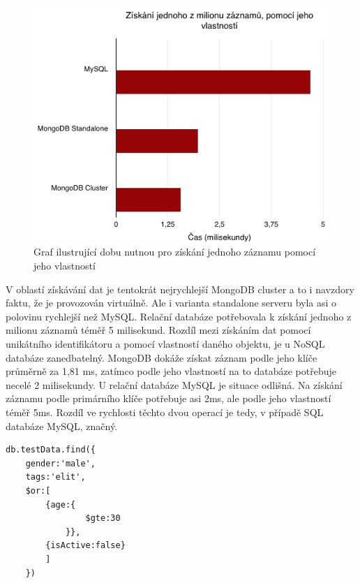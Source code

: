 \begin{figure}[h]
\begin{centering}
\includegraphics[scale=0.6]{obrazky/grafy/select}
\par\end{centering}
\caption{Graf ilustrující dobu nutnou pro získání jednoho záznamu pomocí jeho vlastností}
\end{figure}

\pagebreak
V oblastí získávání dat je tentokrát nejrychlejší MongoDB cluster a to i navzdory faktu, že je provozován virtuálně. Ale i varianta standalone serveru byla asi o polovinu rychlejší než MySQL. Relační databáze potřebovala k získání jednoho z milionu záznamů téměř 5 milisekund. Rozdíl mezi  získáním dat pomocí unikátního identifikátoru a pomocí vlastností daného objektu, je u NoSQL databáze zanedbatelný.  MongoDB dokáže získat záznam podle jeho klíče průměrně za 1,81 ms, zatímco podle jeho vlastností na to databáze potřebuje necelé 2 milisekundy. U relační databáze MySQL je situace odlišná. Na získání záznamu podle primárního klíče potřebuje asi 2ms, ale podle jeho vlastností téměř 5ms. Rozdíl ve rychlosti těchto dvou operací je tedy, v případě SQL databáze MySQL, značný.

\begin{lstlisting}[caption={Ukázka dotazu na osobu pomocí charakteristik v MongoDB}]
db.testData.find({
	gender:'male',
	tags:'elit',
	$or:[
		{age:{
				$gte:30
			}},
		{isActive:false}
		]
	})
\end{lstlisting}

